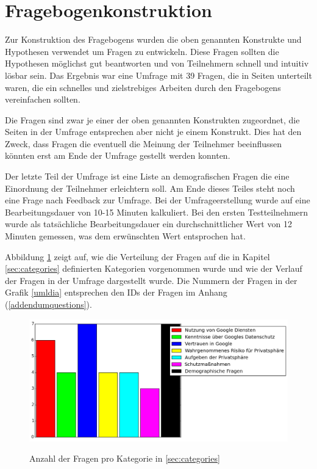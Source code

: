 \section{Fragebogenkonstruktion}
Zur Konstruktion des Fragebogens wurden die oben genannten Konstrukte und Hypothesen verwendet um Fragen zu entwickeln. Diese Fragen sollten die Hypothesen möglichst gut beantworten und von Teilnehmern schnell und intuitiv lösbar sein. Das Ergebnis war eine Umfrage mit 39 Fragen, die in Seiten unterteilt waren, die ein schnelles und zielstrebiges Arbeiten durch den Fragebogens vereinfachen sollten.

Die Fragen sind zwar je einer der oben genannten Konstrukten zugeordnet, die Seiten in der Umfrage entsprechen aber nicht je einem Konstrukt. Dies hat den Zweck, dass Fragen die eventuell die Meinung der Teilnehmer beeinflussen könnten erst am Ende der Umfrage gestellt werden konnten.

Der letzte Teil der Umfrage ist eine Liste an demografischen Fragen die eine Einordnung der Teilnehmer erleichtern soll. Am Ende dieses Teiles steht noch eine Frage nach Feedback zur Umfrage.
Bei der Umfrageerstellung wurde auf eine Bearbeitungsdauer von 10-15 Minuten kalkuliert. Bei den ersten Testteilnehmern wurde als tatsächliche Bearbeitungsdauer ein durchschnittlicher Wert von 12 Minuten gemessen, was dem erwünschten Wert entsprochen hat.

Abbildung \ref{catnumbers} zeigt auf, wie die Verteilung der Fragen auf die in Kapitel \ref{sec:categories} definierten Kategorien vorgenommen wurde und wie der Verlauf der Fragen in der Umfrage dargestellt wurde. Die Nummern der Fragen in der Grafik \ref{umldia} entsprechen den IDs der Fragen im Anhang (\ref{addendumquestions}). 

\begin{figure}[H]
\centering
\includegraphics[width=\textwidth]{images/zahlenkategorien}\\
\caption{Anzahl der Fragen pro Kategorie in \ref{sec:categories}}\label{catnumbers}
\end{figure}

